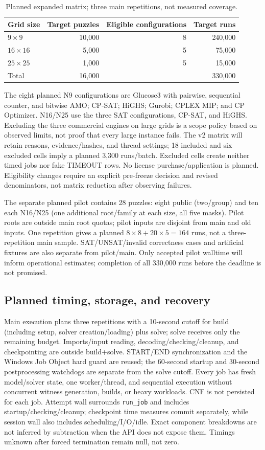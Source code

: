 \begin{table}[pos=H]
\centering
\caption{Planned expanded matrix; three main repetitions, not measured coverage.}
\begin{tabular}{lrrr}
\hline
Grid size & Target puzzles & Eligible configurations & Target runs\\
\hline
$9\times9$ & 10,000 & 8 & 240,000\\
$16\times16$ & 5,000 & 5 & 75,000\\
$25\times25$ & 1,000 & 5 & 15,000\\
\hline
Total & 16,000 & & 330,000\\
\hline
\end{tabular}
\end{table}

The eight planned N9 configurations are Glucose3 with pairwise, sequential
counter, and bitwise AMO; CP-SAT; HiGHS; Gurobi; CPLEX MIP; and CP Optimizer.
N16/N25 use the three SAT configurations, CP-SAT, and HiGHS. Excluding the
three commercial engines on large grids is a scope policy based on observed
limits, not proof that every large instance fails. The v2 matrix will retain
reasons, evidence/hashes, and thread settings; 18 included and six excluded
cells imply a planned 3,300 runs/batch. Excluded cells create neither timed
jobs nor fake TIMEOUT rows. No license purchase/application is planned.
Eligibility changes require an explicit pre-freeze decision and revised
denominators, not matrix reduction after observing failures.

The separate planned pilot contains 28 puzzles: eight public (two/group) and
ten each N16/N25 (one additional root/family at each size, all five masks).
Pilot roots are outside main root quotas; pilot inputs are disjoint from
main and old inputs. One repetition gives a planned $8\times8+20\times5=164$
runs, not a three-repetition main sample. SAT/UNSAT/invalid correctness cases
and artificial fixtures are also separate from pilot/main. Only accepted
pilot walltime will inform operational estimates; completion of all 330,000
runs before the deadline is not promised.

\subsection{Planned timing, storage, and recovery}
Main execution plans three repetitions with a 10-second cutoff for build
(including setup, solver creation/loading) plus solve; solve receives only
the remaining budget. Imports/input reading, decoding/checking/cleanup, and
checkpointing are outside build+solve. START/END synchronization and the
Windows Job Object hard guard are reused; the 60-second startup and
30-second postprocessing watchdogs are separate from the solve cutoff.
Every job has fresh model/solver state, one worker/thread, and sequential
execution without concurrent witness generation, builds, or heavy workloads.
CNF is not persisted for each job. Attempt wall surrounds \texttt{run\_job}
and includes startup/checking/cleanup; checkpoint time measures commit
separately, while session wall also includes scheduling/I/O/idle. Exact
component breakdowns are not inferred by subtraction when the API does not
expose them. Timings unknown after forced termination remain null, not zero.

